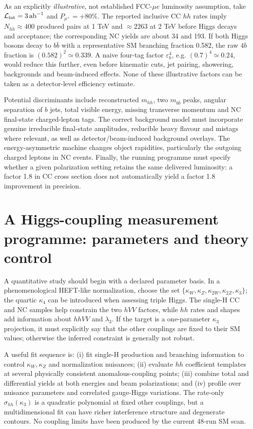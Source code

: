 \documentclass[12pt,a4paper]{article}
\newcommand{\newnote}{\clearpage}
\newcommand{\eps}{\varepsilon}
\newcommand{\Lumi}{\mathcal{L}}
\begin{document}
As an explicitly \emph{illustrative}, not established FCC-$\mu e$ luminosity assumption, take $\Lumi_{\rm int}=3\,\mathrm{ab}^{-1}$ and $P_{\mu^+}=+80\%$. The reported inclusive CC $hh$ rates imply $N_{hh}\approx400$ produced pairs at 1 TeV and $\approx2263$ at 2 TeV before Higgs decays and acceptance; the corresponding NC yields are about 34 and 193. If both Higgs bosons decay to $b\bar b$ with a representative SM branching fraction 0.582, the raw $4b$ fraction is $(0.582)^2\simeq0.339$. A naive four-tag factor $\eps_b^4$, e.g. $(0.7)^4\simeq0.24$, would reduce this further, even before kinematic cuts, jet pairing, showering, backgrounds and beam-induced effects. None of these illustrative factors can be taken as a detector-level efficiency estimate.

Potential discriminants include reconstructed $m_{hh}$, two $m_{b\bar b}$ peaks, angular separation of $b$ jets, total visible energy, missing transverse momentum and NC final-state charged-lepton tags. The correct background model must incorporate genuine irreducible final-state amplitudes, reducible heavy flavour and mistags where relevant, as well as detector/beam-induced background overlays. The energy-asymmetric machine changes object rapidities, particularly the outgoing charged leptons in NC events. Finally, the running programme must specify whether a given polarization setting retains the same delivered luminosity: a factor 1.8 in CC cross section does not automatically yield a factor 1.8 improvement in precision.




\newnote

\section{A Higgs-coupling measurement programme: parameters and theory control}

A quantitative study should begin with a declared parameter basis. In a phenomenological HEFT-like normalization, choose the set $\{\kappa_W,\kappa_Z,\kappa_{2W},\kappa_{2Z},\kappa_3\}$; the quartic $\kappa_4$ can be introduced when assessing triple Higgs. The single-H CC and NC samples help constrain the two $hVV$ factors, while $hh$ rates and shapes add information about $hhVV$ and $\lambda_3$. If the target is a one-parameter $\kappa_3$ projection, it must explicitly say that the other couplings are fixed to their SM values; otherwise the inferred constraint is generally not robust.

A useful fit sequence is: (i) fit single-H production and branching information to control $\kappa_W,\kappa_Z$ and normalization nuisances; (ii) evaluate $hh$ coefficient templates at several physically consistent anomalous-coupling points; (iii) combine total and differential yields at both energies and beam polarizations; and (iv) profile over nuisance parameters and correlated gauge-Higgs variations. The rate-only $\sigma_{hh}(\kappa_3)$ is a quadratic polynomial at fixed other couplings, but a multidimensional fit can have richer interference structure and degenerate contours. No coupling limits have been produced by the current 48-run SM scan.
\end{document}
